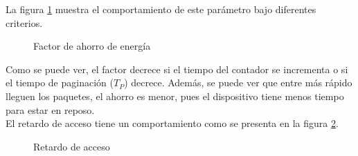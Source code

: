 \documentclass[journal]{IEEEtran}
\begin{document}
La figura \ref{ps} muestra el comportamiento de este parámetro bajo diferentes criterios.

\begin{figure}[h]
\centering
{}
\caption{Factor de ahorro de energía}
\label{ps}
\end{figure}

Como se puede ver, el factor decrece si el tiempo del contador se incrementa o si el tiempo de paginación ($T_{P}$) decrece. Además, se puede ver que entre más rápido lleguen los paquetes, el ahorro es menor, pues el dispositivo tiene menos tiempo para estar en reposo.\\

El retardo de acceso tiene un comportamiento como se presenta en la figura \ref{acceso}.

\begin{figure}[h]
\centering
{}
\caption{Retardo de acceso}
\label{acceso}
\end{figure}
\end{document}
